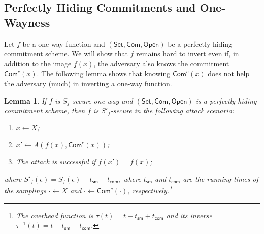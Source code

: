 \documentclass{article}
\newtheorem{lemma}{Lemma}[section]
\newcommand{\setup}[0]{\mathsf{Set}}
\newcommand{\commit}[0]{\mathsf{Com}}
\newcommand{\open}[0]{\mathsf{Open}}
\newcommand{\commitc}[0]{\mathsf{Com}^{c}}
\begin{document}
\subsection{Perfectly Hiding Commitments and One-Wayness}

Let $f$ be a one way function and $(\setup, \commit, \open)$ be a perfectly hiding commitment scheme. We will show that $f$ remains hard to invert even if, in addition to the image $f(x)$, the adversary also knows the commitment $\commitc(x)$. The following lemma shows that knowing $\commitc(x)$ does not help the adversary (much) in inverting a one-way function.

\begin{lemma}
If $f$ is $S_f$-secure one-way and $(\setup, \commit, \open)$ is a perfectly hiding commitment scheme, then $f$ is $S'_f$-secure in the following attack scenario:
\begin{enumerate}
\item $x\gets X$;
\item $x'\gets A(f(x),\commitc(x))$;
\item The attack is successful if $f(x')=f(x)$;
\end{enumerate}
where $S'_f(\epsilon) = S_f(\epsilon) - t_\mathsf{sm} - t_\mathsf{com}$, where $t_\mathsf{sm}$ and $t_\mathsf{com}$ are the running times of the samplings $\cdot\gets X$ and $\cdot\gets \commitc(\cdot)$, respectively.\footnote{The overhead function is $\tau(t)=t + t_\mathsf{sm} + t_\mathsf{com}$ and its inverse $\tau^{-1}(t) = t - t_\mathsf{sm} - t_\mathsf{com}$.}
\end{lemma}
\end{document}
